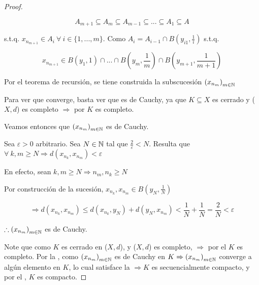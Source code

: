 \begin{proof}
\begin{enumerate}
        $$A_{m+1} \subseteq A_m \subseteq A_{m-1} \subseteq ... \subseteq A_1 \subseteq A$$

        s.t.q. $x_{n_{m+1}} \in A_i \: \forall \: i \in \{1, ..., m \}$. Como $A_{i} = A_{i-1} \cap B\left( y_{i1}, \frac{1}{i} \right)$ s.t.q.

        $$ x_{n_{m+1}}  \in B(y_1, 1) \cap ... \cap  B\left( y_m, \frac{1}{m} \right) \cap B\left( y_{m+1}, \frac{1}{m+1} \right)$$

        Por el teorema de recursión, se tiene construida la subscucesión $ {\left( x_{n_m}\right)}_{m \in \mathbb{N}}$

        Para ver que converge, basta ver que es de Cauchy, ya que $K \subseteq X$ es cerrado y ($X,d$) es completo $\Rightarrow$ por  $K$ es completo.

        Veamos entonces que $ {\left( x_{n_m}\right)}_{m \in \mathbb{N}}$ es de Cauchy.

        Sea $\varepsilon > 0$ arbitrario. Sea $N \in \mathbb{N}$ tal que $\frac{2}{\varepsilon} < N$. Resulta que $\forall \: k, m \geqslant N \Rightarrow d(x_{n_k}, x_{n_m}) < \varepsilon$

        En efecto, sean $k, m \geqslant N \Rightarrow n_m , n_k \geqslant N$

        Por construcción de la sucesión, $x_{n_k}, x_{n_m} \in B\left( y_{N}, \frac{1}{N} \right)$

        $$\Rightarrow  d(x_{n_k}, x_{n_m}) \leqslant d(x_{n_k}, y_N) + d(y_N, x_{n_m}) < \frac{1}{N} + \frac{1}{N} = \frac{2}{N} < \varepsilon$$

        $ \therefore {\left( x_{n_m}\right)}_{m \in \mathbb{N}}$ es de Cauchy.
    \end{enumerate}

    Note que como $K$ es cerrado en ($X,d$), y ($X,d$) es completo, $\Rightarrow$ por el  $K$ es completo. Por la , como $ {\left( x_{n_m}\right)}_{m \in \mathbb{N}}$ es de Cauchy en $K \Rightarrow {\left( x_{n_m}\right)}_{m \in \mathbb{N}}$ converge a algún elemento en $K$, lo cual satisface la  $\Rightarrow K$ es secuencialmente compacto, y por el , $K$ es compacto.
\end{proof}